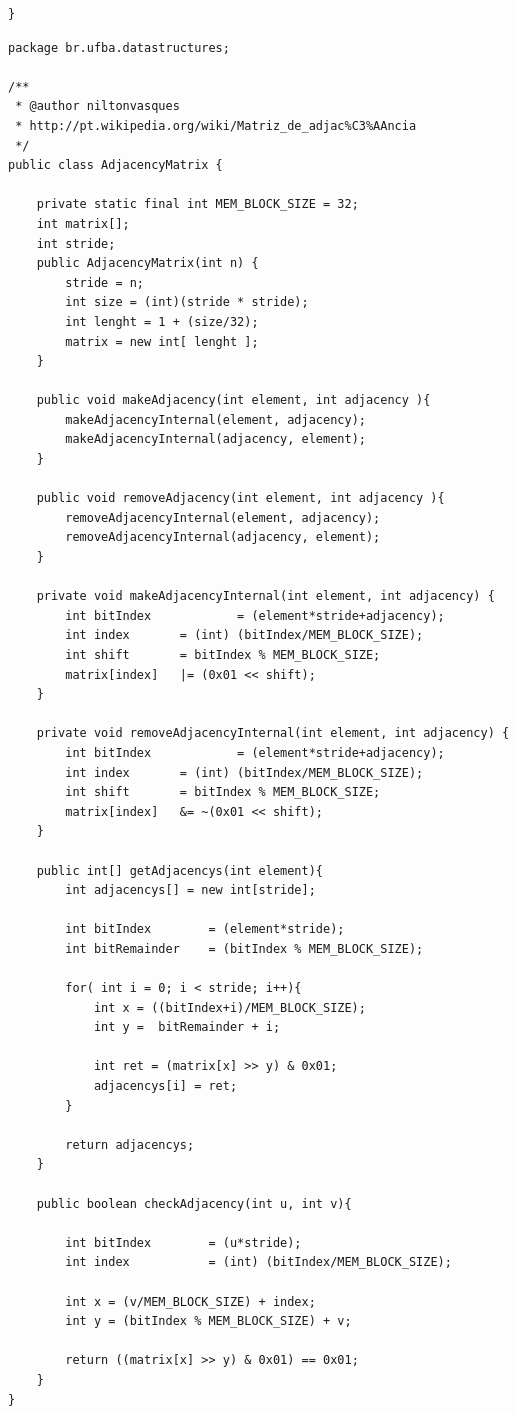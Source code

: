 \documentclass[a4paper,12pt]{article}
\begin{document}
\begin{appendices}
\begin{lstlisting}[title=Interface Para Operações Union-Find com Lista Encadeada]
}
\end{lstlisting}

\begin{lstlisting}[title=Implementação da Matriz de Adjacências Binária]
package br.ufba.datastructures;

/**
 * @author niltonvasques
 * http://pt.wikipedia.org/wiki/Matriz_de_adjac%C3%AAncia
 */
public class AdjacencyMatrix {

	private static final int MEM_BLOCK_SIZE = 32;
	int matrix[];
	int stride;
	public AdjacencyMatrix(int n) {
		stride = n;
		int size = (int)(stride * stride);
		int lenght = 1 + (size/32);
		matrix = new int[ lenght ];	
	}

	public void makeAdjacency(int element, int adjacency ){
		makeAdjacencyInternal(element, adjacency);
		makeAdjacencyInternal(adjacency, element);  
	}

	public void removeAdjacency(int element, int adjacency ){
		removeAdjacencyInternal(element, adjacency);
		removeAdjacencyInternal(adjacency, element);  
	}

	private void makeAdjacencyInternal(int element, int adjacency) {
		int bitIndex			= (element*stride+adjacency);
		int index 		= (int) (bitIndex/MEM_BLOCK_SIZE);
		int shift 		= bitIndex % MEM_BLOCK_SIZE;
		matrix[index] 	|= (0x01 << shift);
	}

	private void removeAdjacencyInternal(int element, int adjacency) {
		int bitIndex			= (element*stride+adjacency);
		int index 		= (int) (bitIndex/MEM_BLOCK_SIZE);
		int shift 		= bitIndex % MEM_BLOCK_SIZE;
		matrix[index] 	&= ~(0x01 << shift);
	}

	public int[] getAdjacencys(int element){
		int adjacencys[] = new int[stride];

		int bitIndex		= (element*stride);
		int bitRemainder	= (bitIndex % MEM_BLOCK_SIZE);

		for( int i = 0; i < stride; i++){
			int x = ((bitIndex+i)/MEM_BLOCK_SIZE);
			int y =  bitRemainder + i;

			int ret = (matrix[x] >> y) & 0x01;
			adjacencys[i] = ret;		
		}		

		return adjacencys;
	}

	public boolean checkAdjacency(int u, int v){

		int bitIndex		= (u*stride);
		int index 			= (int) (bitIndex/MEM_BLOCK_SIZE);

		int x = (v/MEM_BLOCK_SIZE) + index;
		int y = (bitIndex % MEM_BLOCK_SIZE) + v;

		return ((matrix[x] >> y) & 0x01) == 0x01;
	}
}
\end{lstlisting}

\end{appendices}



\end{document}
